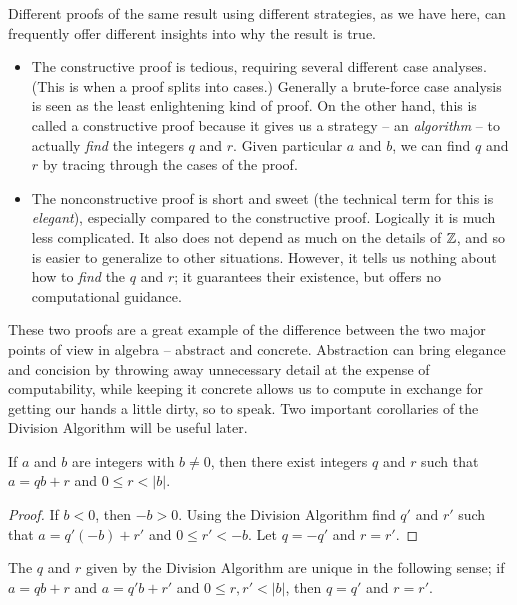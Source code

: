 Different proofs of the same result using different strategies, as we have here, can frequently offer different insights into why the result is true.
\begin{itemize}
\item The constructive proof is tedious, requiring several different case analyses.
(This is when a proof splits into cases.)
Generally a brute-force case analysis is seen as the least enlightening kind of proof.
On the other hand, this is called a constructive proof because it gives us a strategy -- an \emph{algorithm} -- to actually \emph{find} the integers \(q\) and \(r\).
Given particular \(a\) and \(b\), we can find \(q\) and \(r\) by tracing through the cases of the proof.
\item The nonconstructive proof is short and sweet (the technical term for this is \emph{elegant}), especially compared to the constructive proof.
Logically it is much less complicated.
It also does not depend as much on the details of \(\mathbb{Z}\), and so is easier to generalize to other situations.
However, it tells us nothing about how to \emph{find} the \(q\) and \(r\); it guarantees their existence, but offers no computational guidance.
\end{itemize}

These two proofs are a great example of the difference between the two major points of view in algebra -- abstract and concrete.
Abstraction can bring elegance and concision by throwing away unnecessary detail at the expense of computability, while keeping it concrete allows us to compute in exchange for getting our hands a little dirty, so to speak.
Two important corollaries of the Division Algorithm will be useful later.

\begin{cor}
If \(a\) and \(b\) are integers with \(b \neq 0\), then there exist integers \(q\) and \(r\) such that \(a = qb + r\) and \(0 \leq r < |b|\).
\end{cor}

\begin{proof}
If \(b < 0\), then \(-b > 0\).
Using the Division Algorithm find \(q'\) and \(r'\) such that \(a = q'(-b) + r'\) and \(0 \leq r' < -b\).
Let \(q = -q'\) and \(r = r'\).
\end{proof}

\begin{cor}
The \(q\) and \(r\) given by the Division Algorithm are unique in the following sense; if \(a = qb + r\) and \(a = q'b + r'\) and \(0 \leq r,r' < |b|\), then \(q = q'\) and \(r = r'\).
\end{cor}

